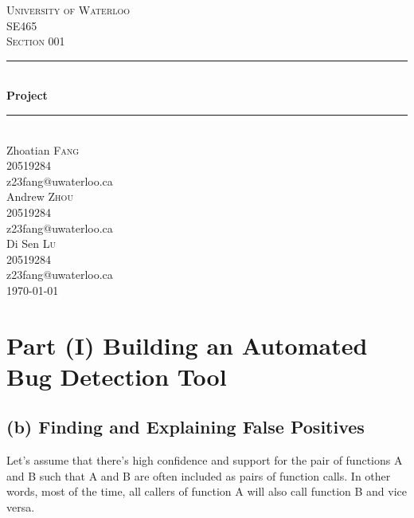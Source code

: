 \documentclass{article}
\begin{document}

\begin{titlepage}

\newcommand{\HRule}{\rule{\linewidth}{0.5mm}}

\center

\textsc{\huge University of Waterloo}\\[2cm]
\textsc{\LARGE SE465}\\[1cm] 
\textsc{\Large Section 001}\\[1cm] 

\HRule \\[0.5cm]
{ \Huge \bfseries Project}\\[0.5cm] 
\HRule \\[0.5cm]
 
\LARGE Zhoatian \textsc{Fang} \\  [0.5cm]
\Large 20519284 \\  [0.5cm]
z23fang@uwaterloo.ca \\ [1.5cm]

\LARGE Andrew \textsc{Zhou} \\  [0.5cm]
\Large 20519284 \\  [0.5cm]
z23fang@uwaterloo.ca \\ [1.5cm]

\LARGE Di Sen \textsc{Lu} \\  [0.5cm]
\Large 20519284 \\  [0.5cm]
z23fang@uwaterloo.ca \\ [1.5cm]

{\Large \today}\\

\vfill 

\end{titlepage}

\section*{Part (I) Building an Automated Bug Detection Tool}

\subsection*{(b) Finding and Explaining False Positives}
Let's assume that there's high confidence and support for the pair of functions A and B such that A and B are often included as pairs of function calls. In other words, most of the time, all callers of function A will also call function B and vice versa. \\
\end{document}

